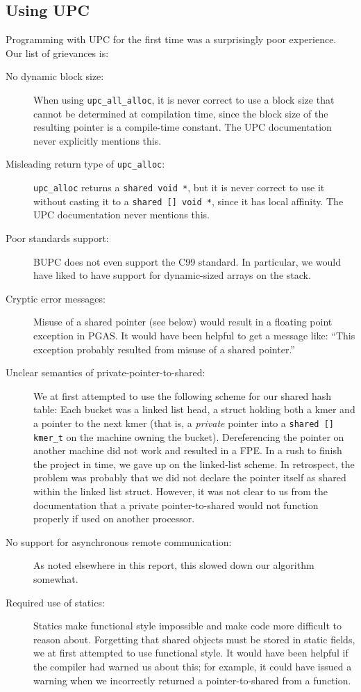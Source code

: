 \documentclass{article}
\begin{document}
\subsection{Using UPC}
Programming with UPC for the first time was a surprisingly poor experience.  Our list of grievances is:
\begin{description}
  \item[No dynamic block size:] When using \texttt{upc\_all\_alloc}, it is never correct to use a block size that cannot be determined at compilation time, since the block size of the resulting pointer is a compile-time constant.  The UPC documentation never explicitly mentions this.
  \item[Misleading return type of \texttt{upc\_alloc}:] \texttt{upc\_alloc} returns a \texttt{shared void *}, but it is never correct to use it without casting it to a \texttt{shared [] void *}, since it has local affinity.  The UPC documentation never mentions this.
  \item[Poor standards support:] BUPC does not even support the C99 standard.  In particular, we would have liked to have support for dynamic-sized arrays on the stack.
  \item[Cryptic error messages:] Misuse of a shared pointer (see below) would result in a floating point exception in PGAS.  It would have been helpful to get a message like: ``This exception probably resulted from misuse of a shared pointer.''
  \item[Unclear semantics of private-pointer-to-shared:] We at first attempted to use the following scheme for our shared hash table: Each bucket was a linked list head, a struct holding both a kmer and a pointer to the next kmer (that is, a \emph{private} pointer into a \texttt{shared [] kmer\_t} on the machine owning the bucket).  Dereferencing the pointer on another machine did not work and resulted in a FPE.  In a rush to finish the project in time, we gave up on the linked-list scheme.  In retrospect, the problem was probably that we did not declare the pointer itself as shared within the linked list struct.  However, it was not clear to us from the documentation that a private pointer-to-shared would not function properly if used on another processor.
  \item[No support for asynchronous remote communication:] As noted elsewhere in this report, this slowed down our algorithm somewhat.
  \item[Required use of statics:] Statics make functional style impossible and make code more difficult to reason about.  Forgetting that shared objects must be stored in static fields, we at first attempted to use functional style.  It would have been helpful if the compiler had warned us about this; for example, it could have issued a warning when we incorrectly returned a pointer-to-shared from a function.
\end{description}
\end{document}
